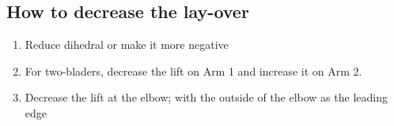 \subsection{How to decrease the lay-over}
\begin{enumerate}
\item Reduce dihedral or make it more negative
\item For two-bladers, decrease the lift on Arm 1 and increase it on Arm 2.
\item Decrease the lift at the elbow; with the outside of the elbow as the leading edge
\end{enumerate}


